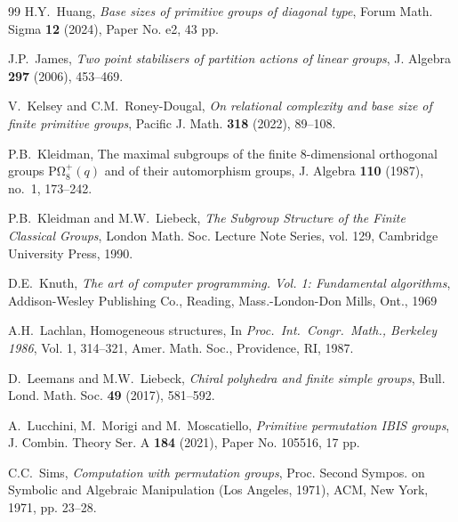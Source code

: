 \documentclass[twoside,a4paper,reqno,11pt]{amsart}
\newcommand{\<}{\langle}
\renewcommand{\>}{\rangle}
\newcommand{\POmega}{\mathrm{P\Omega}}
\theoremstyle{definition}
\begin{document}
\begin{thebibliography}{99}
	H.Y.~Huang, \textit{Base sizes of primitive groups of diagonal type}, Forum Math. Sigma \textbf{12} (2024), Paper No. e2, 43 pp.

    J.P.~James, \textit{Two point stabilisers of partition actions of linear groups}, J. Algebra \textbf{297} (2006), 453–469.
    
    V.~Kelsey and C.M.~Roney-Dougal, \textit{On relational complexity and base size of finite primitive groups}, Pacific J. Math. \textbf{318} (2022), 89–108.

    P.B.~Kleidman, The maximal subgroups of the finite $8$-dimensional orthogonal groups $\POmega^+_8(q)$ and of their automorphism groups, J. Algebra {\bf 110} (1987), no.~1, 173--242.
    
    P.B.~Kleidman and M.W.~Liebeck, \textit{The Subgroup Structure of the Finite Classical Groups}, London Math. Soc. Lecture Note Series, vol. 129, Cambridge University Press, 1990.

    D.E.~Knuth, {\it The art of computer programming. Vol. 1: Fundamental algorithms}, Addison-Wesley Publishing Co., Reading, Mass.-London-Don Mills, Ont., 1969

    A.H.~Lachlan, Homogeneous structures, In \emph{Proc.~Int.~Congr.~Math., Berkeley 1986}, Vol. 1, 314–321,
      Amer. Math. Soc., Providence, RI, 1987.

    D.~Leemans and M.W.~Liebeck, \textit{Chiral polyhedra and finite simple groups}, Bull. Lond. Math. Soc. \textbf{49} (2017), 581–592.
	
	A.~Lucchini, M.~Morigi and M.~Moscatiello, \textit{Primitive permutation IBIS groups}, J. Combin. Theory Ser. A \textbf{184} (2021), Paper No. 105516, 17 pp.


	C.C.~Sims, \textit{Computation with permutation groups}, Proc. Second Sympos. on Symbolic and Algebraic Manipulation (Los Angeles, 1971), ACM, New York, 1971, pp. 23–28.
	
\end{thebibliography}
	
\end{document}
